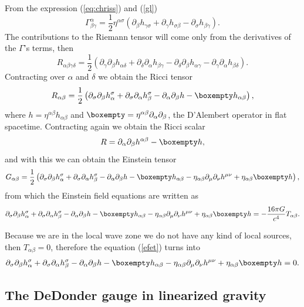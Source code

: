 From the expression (\ref{eq:chriss}) and (\ref{gl})
\[
\Gamma_{\beta\gamma}^{\alpha}=\frac{1}{2}\eta^{\alpha\sigma}\left(\partial_{\beta}h_{\gamma\sigma}+\partial_{\gamma}h_{\sigma\beta}-\partial_{\sigma}h_{\beta\gamma}\right).
\]
The contributions to the Riemann tensor will come only from the derivatives
of the $\Gamma$'s terms, then
\[
R_{\alpha\beta\gamma\delta}=\frac{1}{2}\left(\partial_{\gamma}\partial_{\beta}h_{\alpha\delta}+\partial_{\delta}\partial_{\alpha}h_{\beta\gamma}-\partial_{\delta}\partial_{\beta}h_{\alpha\gamma}-\partial_{\gamma}\partial_{\alpha}h_{\beta\delta}\right).
\]
Contracting over $\alpha$ and $\delta$ we obtain the Ricci tensor
\[
R_{\alpha\beta}=\frac{1}{2}\left(\partial_{\sigma}\partial_{\beta}h_{\alpha}^{\sigma}+\partial_{\sigma}\partial_{\alpha}h_{\beta}^{\sigma}-\partial_{\alpha}\partial_{\beta}h-\boxempty h_{\alpha\beta}\right),
\]
where $h=\eta^{\alpha\beta}h_{\alpha\beta}$ and $\boxempty=\eta^{\alpha\beta}\partial_{\alpha}\partial_{\beta}$,
the D'Alembert operator in flat spacetime. Contracting again we obtain
the Ricci scalar
\[
R=\partial_{\alpha}\partial_{\beta}h^{\alpha\beta}-\boxempty h,
\]
and with this we can obtain the Einstein tensor
\[
G_{\alpha\beta}=\frac{\text{1}}{2}\left(\partial_{\sigma}\partial_{\beta}h_{\alpha}^{\sigma}+\partial_{\sigma}\partial_{\alpha}h_{\beta}^{\sigma}-\partial_{\alpha}\partial_{\beta}h-\boxempty h_{\alpha\beta}-\eta_{\alpha\beta}\partial_{\mu}\partial_{\nu}h^{\mu\nu}+\eta_{\alpha\beta}\boxempty h\right),
\]
from which the Einstein field equations are written as
\begin{equation}
\partial_{\sigma}\partial_{\beta}h_{\alpha}^{\sigma}+\partial_{\sigma}\partial_{\alpha}h_{\beta}^{\sigma}-\partial_{\alpha}\partial_{\beta}h-\boxempty h_{\alpha\beta}-\eta_{\alpha\beta}\partial_{\mu}\partial_{\nu}h^{\mu\nu}+\eta_{\alpha\beta}\boxempty h=-\frac{16\pi G}{c^{4}}T_{\alpha\beta}.\label{efet}
\end{equation}

Because we are in the local wave zone we do not have any kind of local
sources, then $T_{\alpha\beta}=0$, therefore the equation (\ref{efet})
turns into
\[
\partial_{\sigma}\partial_{\beta}h_{\alpha}^{\sigma}+\partial_{\sigma}\partial_{\alpha}h_{\beta}^{\sigma}-\partial_{\alpha}\partial_{\beta}h-\boxempty h_{\alpha\beta}-\eta_{\alpha\beta}\partial_{\mu}\partial_{\nu}h^{\mu\nu}+\eta_{\alpha\beta}\boxempty h=0.
\]

\subsection{The DeDonder gauge in linearized gravity}

